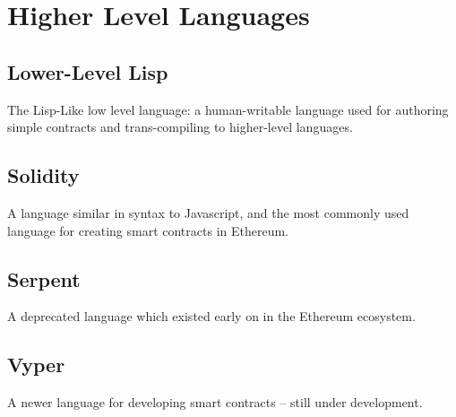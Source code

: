 \documentclass[10pt,a4paper,leqno,bibliography=totoc]{scrartcl}
\newenvironment{alphafootnotes}
{\par\edef\savedfootnotenumber{\number\value{footnote}}
\renewcommand{\thefootnote}{\alph{footnote}}
\setcounter{footnote}{0}}
{\par\setcounter{footnote}{\savedfootnotenumber}}
\begin{document}
\begin{alphafootnotes}
		
	\section{Higher Level Languages}
		\subsection{Lower-Level Lisp}
			The Lisp-Like low level language: a human-writable language used for authoring simple contracts and trans-compiling to higher-level languages.	
		\subsection{Solidity}
			A language similar in syntax to Javascript, and the most commonly used language for creating smart contracts in Ethereum.
		\subsection{Serpent}
			A deprecated language which existed early on in the Ethereum ecosystem.
		\subsection{Vyper}
			A newer language for developing smart contracts -- still under development.



\clearpage
\begin{multicols*}{2}
\printbibliography
\clearpage
\printglossary[type=\acronymtype]
\glsaddall
\printnoidxglossaries
\clearpage
\end{multicols*}
\end{alphafootnotes}

\printindex
\end{document}
